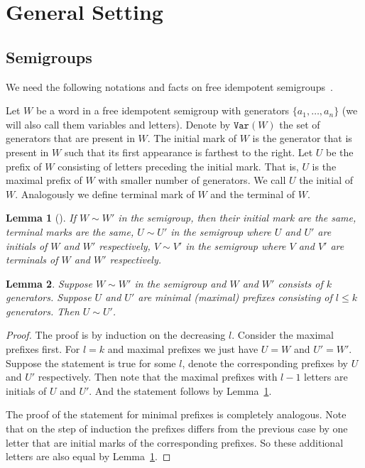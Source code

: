 \documentclass[11pt,letterpaper]{article}
\newtheorem{lemma}{Lemma}
\newcommand{\var}{\texttt{Var}}
\begin{document}
\section{General Setting}
\subsection{Semigroups}

We need the following notations and facts on free idempotent semigroups~\cite{GreenR52}.

Let $W$ be a word in a free idempotent semigroup with generators $\{a_1,\ldots, a_n\}$ (we will also call them variables and letters). Denote by $\var(W)$ the set of generators that are present in $W$. The initial mark of $W$ is the generator that is present in $W$ such that its first appearance is farthest to the right. Let $U$ be the prefix of $W$ consisting of letters preceding the initial mark. That is, $U$ is the maximal prefix of $W$ with smaller number of generators. We call $U$ the initial of $W$. Analogously we define terminal mark of $W$ and the terminal of $W$.

\begin{lemma}[\cite{GreenR52}] \label{lem:GR}
If $W\sim W'$ in the semigroup, then their initial mark are the same, terminal marks are the same, $U \sim U'$ in the semigroup where $U$ and $U'$ are initials of $W$ and $W'$ respectively, $V\sim V'$ in the semigroup where $V$ and $V'$ are terminals of $W$ and $W'$ respectively.
\end{lemma}

\begin{lemma} \label{lem:prefix_equivalence}
Suppose $W\sim W'$ in the semigroup and $W$ and $W'$ consists of $k$ generators. Suppose $U$ and $U'$ are minimal (maximal) prefixes consisting of $l\leq k$ generators. Then $U\sim U'$.
\end{lemma}

\begin{proof}
The proof is by induction on the decreasing $l$. Consider the maximal prefixes first. For $l=k$ and maximal prefixes we just have $U= W$ and $U'=W'$. Suppose the statement is true for some $l$, denote the corresponding prefixes by $U$ and $U'$ respectively. Then note that the maximal prefixes with $l-1$ letters are initials of $U$ and $U'$. And the statement follows by Lemma~\ref{lem:GR}.

The proof of the statement for minimal prefixes is completely analogous. Note that on the step of induction the prefixes differs from the previous case by one letter that are  initial marks of the corresponding prefixes. So these additional letters are also equal by Lemma~\ref{lem:GR}.
\end{proof}
\end{document}
